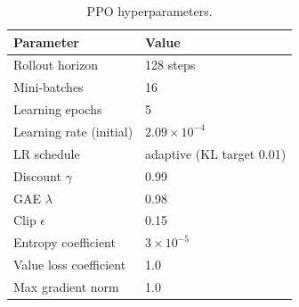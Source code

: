 \begin{table}[h]
\centering
\caption{PPO hyperparameters.}
\label{tab:app_ppo_hparams}
\small
\begin{tabular}{ll}
\toprule
Parameter & Value \\
\midrule
Rollout horizon           & 128 steps \\
Mini-batches              & 16 \\
Learning epochs           & 5 \\
Learning rate (initial)   & $2.09 \times 10^{-4}$ \\
LR schedule               & adaptive (KL target 0.01) \\
Discount $\gamma$         & 0.99 \\
GAE $\lambda$             & 0.98 \\
Clip $\epsilon$           & 0.15 \\
Entropy coefficient       & $3 \times 10^{-5}$ \\
Value loss coefficient    & 1.0 \\
Max gradient norm         & 1.0 \\
\bottomrule
\end{tabular}
\end{table}
